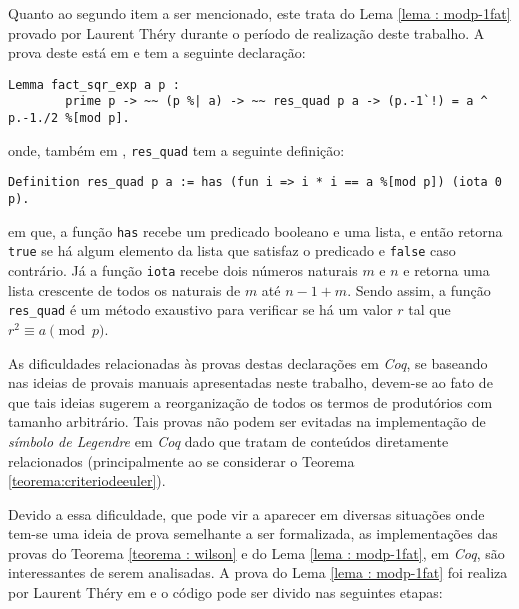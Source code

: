 Quanto ao segundo item a ser mencionado, este trata do Lema \ref{lema : modp-1fat} provado por Laurent Théry durante o período de realização deste trabalho. A prova deste está em \cite{mathcomp-extra-euler} e tem a seguinte declaração:
        \begin{lstlisting}[language=coq,frame=single,tabsize=1]
Lemma fact_sqr_exp a p :
        prime p -> ~~ (p %| a) -> ~~ res_quad p a -> (p.-1`!) = a ^ p.-1./2 %[mod p].
        \end{lstlisting}
onde, também em \cite{mathcomp-extra-euler}, \lstinline[language=coq]!res_quad! tem a seguinte definição:
        \begin{lstlisting}[language=coq,frame=single,tabsize=1]
Definition res_quad p a := has (fun i => i * i == a %[mod p]) (iota 0 p).
        \end{lstlisting}
em que, a função \lstinline[language=coq]!has! recebe um predicado booleano e uma lista, e então retorna \lstinline[language=coq]!true!
se há algum elemento da lista que satisfaz o predicado e \lstinline[language=coq]!false! caso contrário. Já a função \lstinline[language=coq]!iota! recebe dois números naturais $m$ e $n$ e retorna uma lista crescente de todos os naturais de $m$ até $n-1+m$. Sendo assim, a função \lstinline[language=coq]!res_quad! é um método exaustivo para verificar se há um valor $r$ tal que $r^{2} \equiv a \pmod{p}$.


As dificuldades relacionadas às provas destas declarações em \textit{Coq}, se baseando nas ideias de provais manuais apresentadas neste trabalho, devem-se ao fato de que tais ideias sugerem a reorganização de todos os termos de produtórios com tamanho arbitrário. Tais provas não podem ser evitadas na implementação de \textit{símbolo de Legendre} em \textit{Coq} dado que tratam de conteúdos diretamente relacionados (principalmente ao se considerar o Teorema \ref{teorema:criteriodeeuler}).

Devido a essa dificuldade, que pode vir a aparecer em diversas situações onde tem-se uma ideia de prova semelhante a ser formalizada, as implementações das provas do Teorema \ref{teorema : wilson} e do Lema \ref{lema : modp-1fat}, em \textit{Coq}, são interessantes de serem analisadas. A prova do Lema \ref{lema : modp-1fat} foi realiza por Laurent Théry em \cite{mathcomp-extra-euler} e o código pode ser divido nas seguintes etapas:

